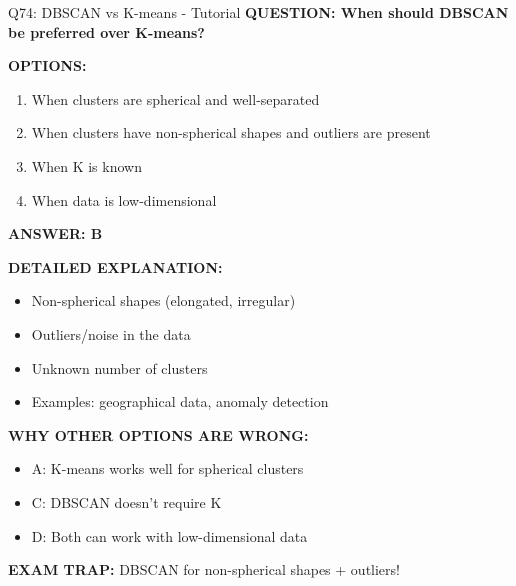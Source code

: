 \documentclass[8pt]{beamer}
\begin{document}
	\begin{frame}{Q74: DBSCAN vs K-means - Tutorial}
		\fontsize{6.5}{7.5}\selectfont
		\textbf{QUESTION: When should DBSCAN be preferred over K-means?}
		
		\vspace{0.1cm}
		\textbf{OPTIONS:}
		\begin{enumerate}
			\item When clusters are spherical and well-separated
			\item When clusters have non-spherical shapes and outliers are present
			\item When K is known
			\item When data is low-dimensional
		\end{enumerate}
		
		\vspace{0.1cm}
		\textcolor{myblue}{\textbf{ANSWER: B}}
		
		\vspace{0.1cm}
		\textbf{DETAILED EXPLANATION:}
		\begin{itemize}
			\item Non-spherical shapes (elongated, irregular)
			\item Outliers/noise in the data
			\item Unknown number of clusters
			\item Examples: geographical data, anomaly detection
		\end{itemize}
		
		\vspace{0.1cm}
		\textcolor{myred}{\textbf{WHY OTHER OPTIONS ARE WRONG:}}
		\begin{itemize}
			\item \textcolor{myred}{A:} K-means works well for spherical clusters
			\item \textcolor{myred}{C:} DBSCAN doesn't require K
			\item \textcolor{myred}{D:} Both can work with low-dimensional data
		\end{itemize}
		
		\textcolor{myred}{\textbf{EXAM TRAP:}} DBSCAN for \textcolor{myblue}{non-spherical shapes + outliers}!
	\end{frame}
	
\end{document}
